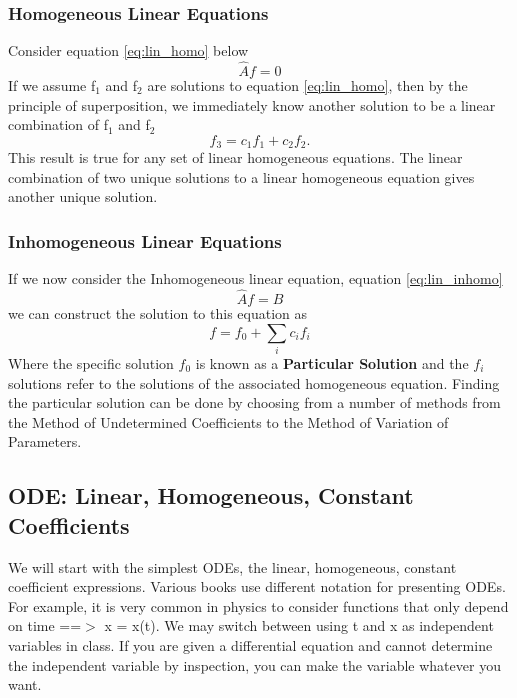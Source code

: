 \documentclass{article}
\newcommand{\be}{\begin{equation}}
\newcommand{\ee}{\end{equation}}
\begin{document}
\subsubsection*{Homogeneous Linear Equations}
Consider equation \ref{eq:lin_homo} below
\be \label{eq:lin_homo}
\hat{A}f = 0
\ee
If we assume f$_1$ and f$_2$ are solutions to equation \ref{eq:lin_homo}, then by the principle of superposition, we immediately know another solution to be a linear combination of f$_1$ and f$_2$
\be
f_3 = c_1f_1 + c_2f_2 .
\ee
This result is true for any set of linear homogeneous equations.
The linear combination of two unique solutions to a linear homogeneous equation gives another unique solution.

\subsubsection*{Inhomogeneous Linear Equations}
If we now consider the Inhomogeneous linear equation, equation \ref{eq:lin_inhomo}
\be \label{eq:lin_inhomo}
\hat{A}f = B
\ee
we can construct the solution to this equation as
\be
f = f_0 + \sum_i c_i f_i
\ee
Where the specific solution $f_0$ is known as a \textbf{Particular Solution} and the $f_i$ solutions refer to the solutions of the associated homogeneous equation.
Finding the particular solution can be done by choosing from a number of methods from the Method of Undetermined Coefficients to the Method of Variation of Parameters.

\subsection*{ODE: Linear, Homogeneous, Constant Coefficients}
We will start with the simplest ODEs, the linear, homogeneous, constant coefficient expressions.
Various books use different notation for presenting ODEs.
For example, it is very common in physics to consider functions that only depend on time ==$>$ x = x(t).
We may switch between using t and x as independent variables in class.
If you are given a differential equation and cannot determine the independent variable by inspection, you can make the variable whatever you want.
\end{document}
